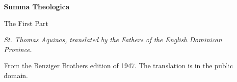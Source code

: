 \documentclass[11pt,letterpaper]{article}
\begin{document}
\color{ink}

\begin{titlepage}
\centering
\vspace*{4em}
{\LARGE\bfseries\color{heading} Summa Theologica\par}
\vspace{1.5em}
{\Large\color{subhead} The First Part\par}
\vspace{2.5em}
{\itshape\color{subhead} St. Thomas Aquinas, translated by the Fathers of
the English Dominican Province.\par}
\vfill
{\small From the Benziger Brothers edition of 1947. The translation is in
the public domain.\par}
\vspace{2em}
\end{titlepage}

\tableofcontents


\end{document}
